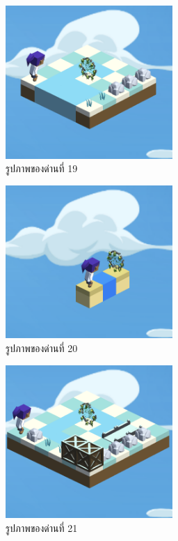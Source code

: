 \begin{figure}[H]
    \begin{center}
    \includegraphics[width=2.5in]{pic-toro/stage/s19.png}
    \end{center}
    \caption[รูปภาพของด่านที่ 19]{รูปภาพของด่านที่ 19}
    \label{s19}
\end{figure}
\begin{figure}[H]
    \begin{center}
    \includegraphics[width=2.5in]{pic-toro/stage/s20.png}
    \end{center}
    \caption[รูปภาพของด่านที่ 20]{รูปภาพของด่านที่ 20}
    \label{s20}
\end{figure}
\begin{figure}[H]
    \begin{center}
    \includegraphics[width=2.5in]{pic-toro/stage/s21.png}
    \end{center}
    \caption[รูปภาพของด่านที่ 21]{รูปภาพของด่านที่ 21}
    \label{s21}
\end{figure}
